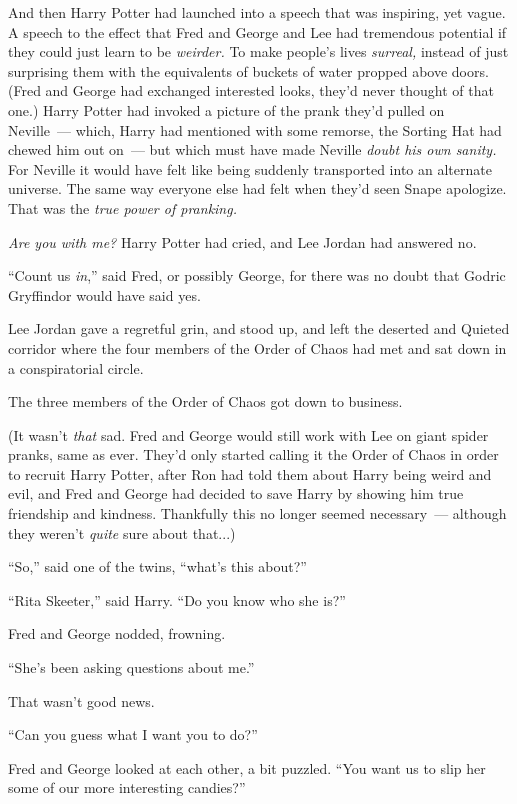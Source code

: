 And then Harry Potter had launched into a speech that was inspiring, yet vague. A speech to the effect that Fred and George and Lee had tremendous potential if they could just learn to be \emph{weirder.} To make people's lives \emph{surreal,} instead of just surprising them with the equivalents of buckets of water propped above doors. (Fred and George had exchanged interested looks, they'd never thought of that one.) Harry Potter had invoked a picture of the prank they'd pulled on Neville~--- which, Harry had mentioned with some remorse, the Sorting Hat had chewed him out on~--- but which must have made Neville \emph{doubt his own sanity.} For Neville it would have felt like being suddenly transported into an alternate universe. The same way everyone else had felt when they'd seen Snape apologize. That was the \emph{true power of pranking.}

\emph{Are you with me?} Harry Potter had cried, and Lee Jordan had answered no.

``Count us \emph{in},'' said Fred, or possibly George, for there was no doubt that Godric Gryffindor would have said yes.

Lee Jordan gave a regretful grin, and stood up, and left the deserted and Quieted corridor where the four members of the Order of Chaos had met and sat down in a conspiratorial circle.

The three members of the Order of Chaos got down to business.

(It wasn't \emph{that} sad. Fred and George would still work with Lee on giant spider pranks, same as ever. They'd only started calling it the Order of Chaos in order to recruit Harry Potter, after Ron had told them about Harry being weird and evil, and Fred and George had decided to save Harry by showing him true friendship and kindness. Thankfully this no longer seemed necessary~--- although they weren't \emph{quite} sure about that...)

``So,'' said one of the twins, ``what's this about?''

``Rita Skeeter,'' said Harry. ``Do you know who she is?''

Fred and George nodded, frowning.

``She's been asking questions about me.''

That wasn't good news.

``Can you guess what I want you to do?''

Fred and George looked at each other, a bit puzzled. ``You want us to slip her some of our more interesting candies?''

